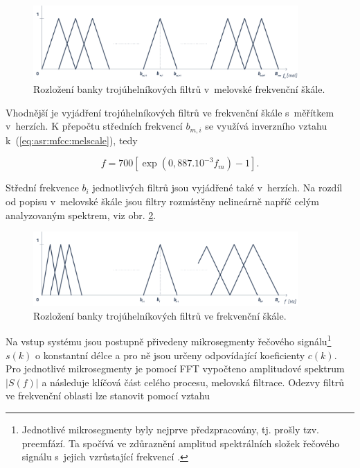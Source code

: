 \begin{figure}[hbpt]
  \centering
  \includegraphics[width=0.9\textwidth]{./ch4-asr/img/filter_bank-mel.pdf}
  \caption{Rozložení banky trojúhelníkových filtrů v~melovské frekvenční škále.}
  \label{fig:asr:mfcc:bank:mel}
\end{figure}

\noindent Vhodnější je vyjádření trojúhelníkových filtrů ve frekvenční škále s~měřítkem v~herzích. K přepočtu středních frekvencí $b_{m,i}$ se využívá inverzního vztahu  k~(\ref{eq:asr:mfcc:melscale}), tedy

\begin{equation}
  f = 700 \left[ \exp\left( 0,887.10^{-3} f_m \right) - 1 \right].
  \label{eq:asr:mfcc:melscale:inverse}
\end{equation}

\noindent Střední frekvence $b_i$ jednotlivých filtrů jsou vyjádřené také v~herzích. Na rozdíl od popisu v~melovské škále jsou filtry rozmístěny nelineárně napříč celým analyzovaným spektrem, viz obr. \ref{fig:asr:mfcc:bank:hz}.

\begin{figure}[hbpt]
  \centering
  \includegraphics[width=0.9\textwidth]{./ch4-asr/img/filter_bank-hz.pdf}
  \caption{Rozložení banky trojúhelníkových filtrů ve frekvenční škále.}
  \label{fig:asr:mfcc:bank:hz}
\end{figure}

Na vstup systému jsou postupně přivedeny mikrosegmenty řečového signálu\footnote{Jednotlivé mikrosegmenty byly nejprve předzpracovány, tj. prošly tzv. preemfází. Ta spočívá ve zdůraznění amplitud spektrálních složek řečového signálu s~jejich vzrůstající frekvencí \cite{Psutka2006}.} $s\left(k\right)$ o konstantní délce a pro ně jsou určeny odpovídající koeficienty $c\left(k\right)$. Pro jednotlivé mikrosegmenty je pomocí FFT vypočteno amplitudové spektrum $\left| S(f) \right|$ a následuje klíčová část celého procesu, melovská filtrace. Odezvy filtrů ve frekvenční oblasti lze stanovit pomocí vztahu

